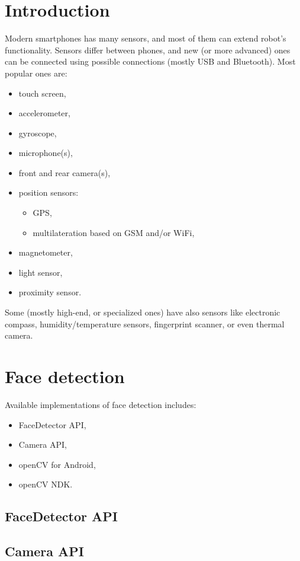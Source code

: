 \documentclass[openany]{mgr} %
\begin{document}
\section{Introduction}
Modern smartphones has many sensors, and most of them can extend robot's
functionality. Sensors differ between phones, and new (or more advanced) ones can
be connected using possible connections (mostly USB and Bluetooth).
Most popular ones are:
\begin{itemize}
  \item touch screen,
  \item accelerometer,
  \item gyroscope,
  \item microphone(s),
  \item front and rear camera(s),
  \item position sensors:
  \begin{itemize}
    \item GPS,
    \item multilateration based on GSM and/or WiFi,
  \end{itemize}
  \item magnetometer,
  \item light sensor,
  \item proximity sensor.
\end{itemize}
Some (mostly high-end, or specialized ones) have also sensors like electronic
compass, humidity/temperature sensors, fingerprint scanner, or even thermal
camera.

\section{Face detection}
Available implementations of face detection includes:
\begin{itemize}
  \item FaceDetector API,
  \item Camera API,
  \item openCV for Android,
  \item openCV NDK.
\end{itemize}


\subsection{FaceDetector API}

\subsection{Camera API}
\end{document}
